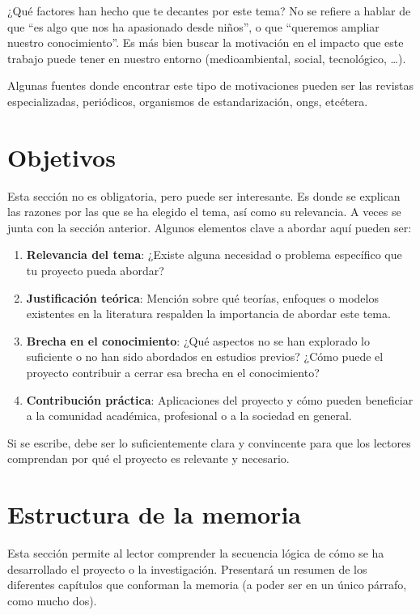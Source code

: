 \documentclass[%
    school=etsisi,%
    type=pfg,%
    degree=61CI,%
]{upm-report}
\begin{document}
¿Qué factores han hecho que te decantes por este tema? No se refiere a
hablar de que \enquote{es algo que nos ha apasionado desde niños}, o que
\enquote{queremos ampliar nuestro conocimiento}. Es más bien buscar la
motivación en el impacto que este trabajo puede tener en nuestro entorno
(medioambiental, social, tecnológico, \ldots).

Algunas fuentes donde encontrar este tipo de motivaciones pueden ser las
revistas especializadas, periódicos, organismos de estandarización,
\glspl{ong}, etcétera.

\section{Objetivos}

Esta sección no es obligatoria, pero puede ser interesante. Es donde se
explican las razones por las que se ha elegido el tema, así como su
relevancia. A veces se junta con la sección anterior. Algunos elementos
clave a abordar aquí pueden ser:

\begin{enumerate}
    \item \textbf{Relevancia del tema}: ¿Existe alguna necesidad o
        problema específico que tu proyecto pueda abordar?
    \item \textbf{Justificación teórica}: Mención sobre qué teorías,
        enfoques o modelos existentes en la literatura respalden la
        importancia de abordar este tema.
    \item \textbf{Brecha en el conocimiento}: ¿Qué aspectos no se han
        explorado lo suficiente o no han sido abordados en estudios
        previos? ¿Cómo puede el proyecto contribuir a cerrar esa brecha
        en el conocimiento?
    \item \textbf{Contribución práctica}: Aplicaciones del proyecto y
        cómo pueden beneficiar a la comunidad académica, profesional o
        a la sociedad en general.
\end{enumerate}

Si se escribe, debe ser lo suficientemente clara y convincente para que
los lectores comprendan por qué el proyecto es relevante y necesario.

\section{Estructura de la memoria}

Esta sección permite al lector comprender la secuencia lógica de cómo se
ha desarrollado el proyecto o la investigación. Presentará un resumen de
los diferentes capítulos que conforman la memoria (a poder ser en un
único párrafo, como mucho dos).
\end{document}
